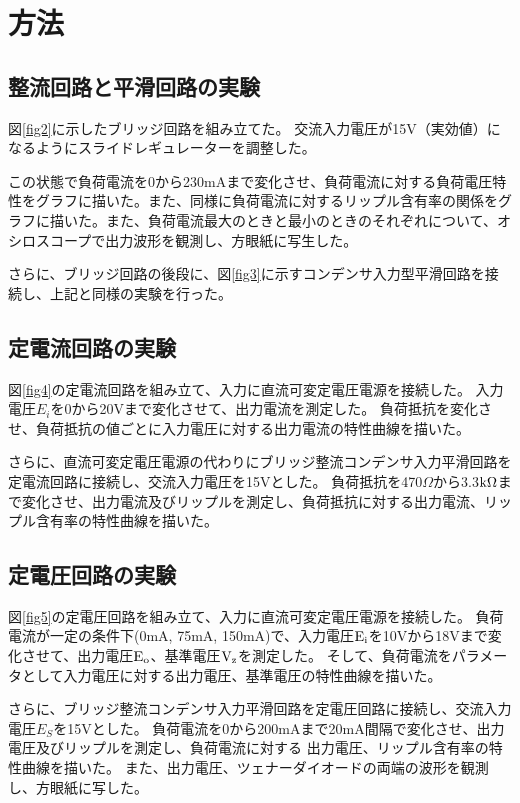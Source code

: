 \documentclass[11pt]{jsarticle}
\newcommand{\fr}[1]{図\ref{#1}}
\begin{document}
\section{方法}
\subsection{整流回路と平滑回路の実験}
\fr{fig2}に示したブリッジ回路を組み立てた。
交流入力電圧が15V（実効値）になるようにスライドレギュレーターを調整した。

この状態で負荷電流を0から230mAまで変化させ、負荷電流に対する負荷電圧特性をグラフに描いた。また、同様に負荷電流に対するリップル含有率の関係をグラフに描いた。また、負荷電流最大のときと最小のときのそれぞれについて、オシロスコープで出力波形を観測し、方眼紙に写生した。

さらに、ブリッジ回路の後段に、\fr{fig3}に示すコンデンサ入力型平滑回路を接続し、上記と同様の実験を行った。

\subsection{定電流回路の実験}
\fr{fig4}の定電流回路を組み立て、入力に直流可変定電圧電源を接続した。
入力電圧$E_i$を0から20Vまで変化させて、出力電流を測定した。
負荷抵抗を変化させ、負荷抵抗の値ごとに入力電圧に対する出力電流の特性曲線を描いた。

さらに、直流可変定電圧電源の代わりにブリッジ整流コンデンサ入力平滑回路を定電流回路に接続し、交流入力電圧を15Vとした。
負荷抵抗を470$\Omega$から3.3${\rm k}\Omega$まで変化させ、出力電流及びリップルを測定し、負荷抵抗に対する出力電流、リップル含有率の特性曲線を描いた。

\subsection{定電圧回路の実験}
\fr{fig5}の定電圧回路を組み立て、入力に直流可変定電圧電源を接続した。
負荷電流が一定の条件下(0mA, 75mA, 150mA)で、入力電圧${\rm E_i}$を10Vから18Vまで変化させて、出力電圧${\rm E_o}$、基準電圧${\rm V_z}$を測定した。
そして、負荷電流をパラメータとして入力電圧に対する出力電圧、基準電圧の特性曲線を描いた。

さらに、ブリッジ整流コンデンサ入力平滑回路を定電圧回路に接続し、交流入力電圧$E_S$を15Vとした。
負荷電流を0から200mAまで20mA間隔で変化させ、出力電圧及びリップルを測定し、負荷電流に対する
出力電圧、リップル含有率の特性曲線を描いた。
また、出力電圧、ツェナーダイオードの両端の波形を観測し、方眼紙に写した。
\end{document}
